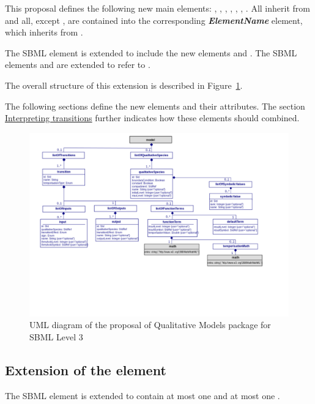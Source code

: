 This proposal defines the following new main elements: , , , , , , . All inherit from  and all, except , are contained into the corresponding \textbf{\emph{ElementName}} element, which inherits from .%

The SBML element  is extended to include the new elements  and . The SBML elements  and  are extended to refer to .

The overall structure of this extension is described in Figure~\ref{fig:UML}.

The following sections define the new elements and their attributes. The section \hyperlink{inter_trans}{Interpreting transitions} further indicates how these elements should combined.

\begin{figure}[!t]
	\begin{center}
		\includegraphics[width=\textwidth]{UML_diagram_qual.pdf}
	\end{center}
	\caption{UML diagram of the proposal of Qualitative Models package for SBML Level 3}
	\label{fig:UML}
\end{figure}

\bigskip
\subsection*{Extension of the  element} %
\label{sub:model}
The SBML element  is extended to contain at most one  and at most one .

